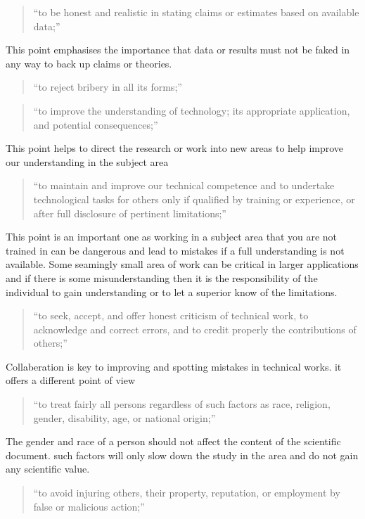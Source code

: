 \documentclass[11pt]{article}
\begin{document}
\begin{quotation}
  ``to be honest and realistic in stating claims or estimates based
  on available data;''
\end{quotation}
This point emphasises the importance that data or results must not be
faked in any way to back up claims or theories.

\begin{quotation}
  ``to reject bribery in all its forms;''
\end{quotation}

\begin{quotation}
  ``to improve the understanding of technology; its appropriate
  application, and potential consequences;''
\end{quotation}
This point helps to direct the research or work into new areas to help
improve our understanding in the subject area

\begin{quotation}
  ``to maintain and improve our technical competence and to
  undertake technological tasks for others only if qualified by training
  or experience, or after full disclosure of pertinent limitations;''
\end{quotation}
This point is an important one as working in a subject area that you are
not trained in can be dangerous and lead to mistakes if a full
understanding is not available. Some seamingly small area of work can be
critical in larger applications and if there is some misunderstanding then
it is the responsibility of the individual to gain understanding or to let
a superior know of the limitations.

\begin{quotation}
  ``to seek, accept, and offer honest criticism of technical work,
  to acknowledge and correct errors, and to credit properly the contributions of
  others;''
\end{quotation}
Collaberation is key to improving and spotting mistakes in technical works.
it offers a different point of view

\begin{quotation}
  ``to treat fairly all persons regardless of such factors as race, religion,
  gender, disability, age, or national origin;''
\end{quotation}
The gender and race of a person should not affect the content of the scientific
document. such factors will only slow down the study in the area and do not gain
any scientific value.

\begin{quotation}
  ``to avoid injuring others, their property, reputation, or employment by false
  or malicious action;''
\end{quotation}
\end{document}
